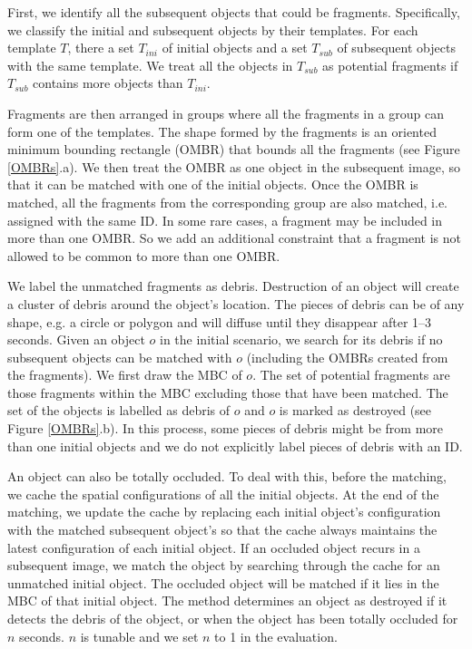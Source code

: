 \documentclass[letterpaper]{article}
\begin{document}
First, we identify all the subsequent objects that could be fragments. Specifically, we classify the initial and subsequent objects by their templates. For each template $T$, there a set $T_{ini}$ of initial objects and a set  $T_{sub}$ of subsequent objects with the same template. We treat all the objects in $T_{sub}$ as potential fragments if $T_{sub}$ contains more objects than $T_{ini}$.

Fragments are then arranged in groups where all the fragments in a group can form one of the templates. The shape formed by the fragments is an oriented minimum bounding rectangle (OMBR) that bounds all the fragments (see Figure \ref{OMBRs}.a). We then treat the OMBR as one object in the subsequent image, so that it can be matched with one of the initial objects.  Once the OMBR is matched, all the fragments from the corresponding group are also matched, i.e. assigned with the same ID. In some rare cases, a fragment may be included in more than one OMBR. So we add an additional constraint that a fragment is not allowed to be common to more than one OMBR.

We label the unmatched fragments as debris. Destruction of an object will create a cluster of debris around the object's location. The pieces of debris can be of any shape, e.g. a circle or polygon and will diffuse until they disappear after 1--3 seconds. Given an object $o$ in the initial scenario, we search for its debris if no subsequent objects can be matched with $o$ (including the OMBRs created from the fragments). We first draw the MBC of $o$. The set of potential fragments are those fragments within the MBC excluding those that have been matched. The set of the objects is labelled as debris of $o$ and $o$ is marked as destroyed (see Figure \ref{OMBRs}.b). In this process, some pieces of debris might be from more than one initial objects and we do not explicitly label pieces of debris with an ID.

An object can also be totally occluded. To deal with this, before the matching, we cache the spatial configurations of all the initial objects. At the end of the matching, we update the cache by replacing each initial object's configuration with the matched subsequent object's so that the cache always maintains the latest configuration of each initial object. If an occluded object recurs in a subsequent image, we match the object by searching through the cache for an unmatched initial object. The occluded object will be matched if it lies in the MBC of that initial object. 
The method determines an object as destroyed if it detects the debris of the object, or when the object has been totally occluded for $n$ seconds. $n$ is tunable and we set $n$ to 1 in the evaluation.  
 
\end{document}
